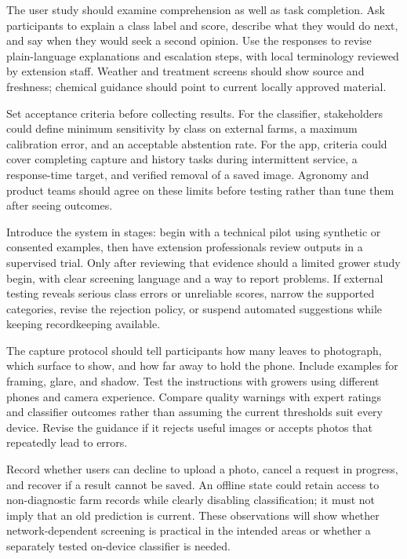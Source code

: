 \documentclass[conference]{IEEEtran}
\begin{document}
The user study should examine comprehension as well as task completion. Ask participants to explain a class label and score, describe what they would do next, and say when they would seek a second opinion. Use the responses to revise plain-language explanations and escalation steps, with local terminology reviewed by extension staff. Weather and treatment screens should show source and freshness; chemical guidance should point to current locally approved material.

Set acceptance criteria before collecting results. For the classifier, stakeholders could define minimum sensitivity by class on external farms, a maximum calibration error, and an acceptable abstention rate. For the app, criteria could cover completing capture and history tasks during intermittent service, a response-time target, and verified removal of a saved image. Agronomy and product teams should agree on these limits before testing rather than tune them after seeing outcomes.

Introduce the system in stages: begin with a technical pilot using synthetic or consented examples, then have extension professionals review outputs in a supervised trial. Only after reviewing that evidence should a limited grower study begin, with clear screening language and a way to report problems. If external testing reveals serious class errors or unreliable scores, narrow the supported categories, revise the rejection policy, or suspend automated suggestions while keeping recordkeeping available.

The capture protocol should tell participants how many leaves to photograph, which surface to show, and how far away to hold the phone. Include examples for framing, glare, and shadow. Test the instructions with growers using different phones and camera experience. Compare quality warnings with expert ratings and classifier outcomes rather than assuming the current thresholds suit every device. Revise the guidance if it rejects useful images or accepts photos that repeatedly lead to errors.

Record whether users can decline to upload a photo, cancel a request in progress, and recover if a result cannot be saved. An offline state could retain access to non-diagnostic farm records while clearly disabling classification; it must not imply that an old prediction is current. These observations will show whether network-dependent screening is practical in the intended areas or whether a separately tested on-device classifier is needed.
\end{document}
